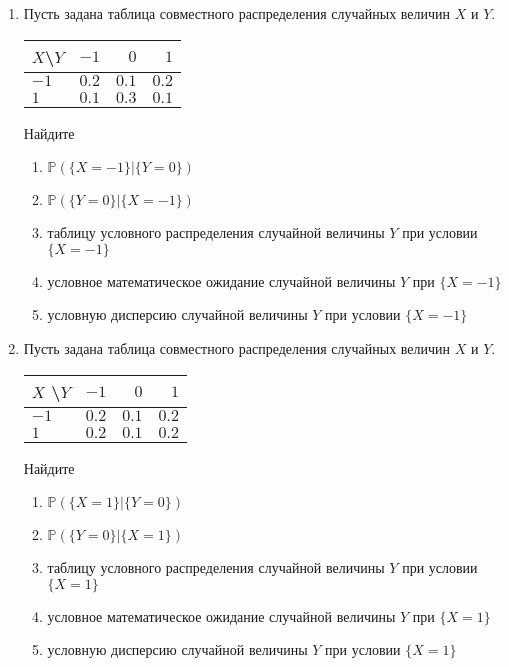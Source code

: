\documentclass[12pt]{article}
\def \P{\mathbb{P}}
\begin{document}
\begin{enumerate}
\item
Пусть задана таблица совместного распределения случайных величин $X$ и $Y$.

\begin{center}\begin{tabular}{l|rrr}
\toprule
 $X$\textbackslash $Y$    & $-1$  & $0$   & $1$   \\ \midrule
$-1$                 & $0.2$ & $0.1$ & $0.2$ \\
 $1$                 & $0.1$ & $0.3$ & $0.1$ \\ \bottomrule
\end{tabular}\end{center}

Найдите  
\begin{enumerate}
\item $\P(\{X = -1\} | \{Y = 0\})$  
\item $\P(\{Y = 0\} | \{X = -1\})$  
\item таблицу условного распределения случайной величины $Y$ при условии $\{X = -1\}$  
\item условное математическое ожидание случайной величины $Y$ при $\{X = -1\}$  
\item условную дисперсию случайной величины $Y$
при условии $\{X = -1\}$  
\end{enumerate}

\item Пусть задана таблица совместного распределения случайных величин $X$ и $Y$.

\begin{center}\begin{tabular}{l|rrr}
\toprule
 $X$ \textbackslash $Y$    & $-1$  & $0$   & $1$   \\ \midrule
$-1$                 & $0.2$ & $0.1$ & $0.2$ \\ 
 $1$                 & $0.2$ & $0.1$ & $0.2$ \\ \bottomrule
\end{tabular}\end{center}

Найдите  
\begin{enumerate}
\item $\P(\{X = 1\} | \{Y = 0\})$  
\item $\P(\{Y = 0\} | \{X = 1\})$  
\item таблицу условного распределения случайной величины $Y$ при условии $\{X = 1\}$  
\item условное математическое ожидание случайной величины $Y$ при $\{X = 1\}$  
\item условную дисперсию случайной величины $Y$
при условии $\{X = 1\}$  
\end{enumerate}


\end{enumerate}
\end{document}
